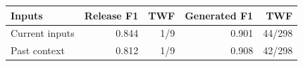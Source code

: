 \begin{tabular}{@{}lrrrr@{}}
\toprule
Inputs & Release F1 & TWF & Generated F1 & TWF \\
\midrule
Current inputs & 0.844 & 1/9 & 0.901 & 44/298 \\
Past context & 0.812 & 1/9 & 0.908 & 42/298 \\
\bottomrule
\end{tabular}
